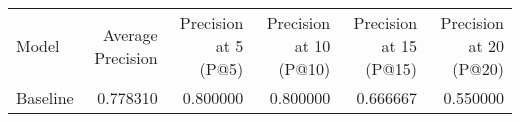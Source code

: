 \begin{tabular}{lrrrrr}
Model & Average Precision & Precision at 5 (P@5) & Precision at 10 (P@10) & Precision at 15 (P@15) & Precision at 20 (P@20) \\
Baseline & 0.778310 & 0.800000 & 0.800000 & 0.666667 & 0.550000 \\
\end{tabular}
